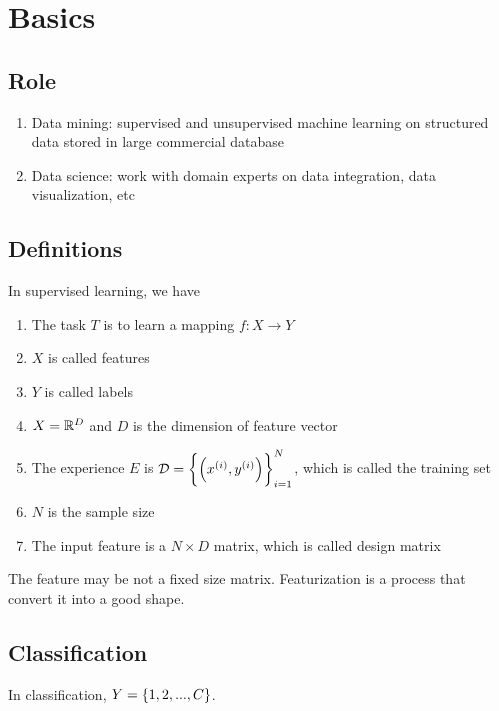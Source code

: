 \chapter{Basics}

\section{Role}

\begin{enumerate}
    \item Data mining: supervised and unsupervised machine learning on structured data stored in large commercial database
    \item Data science: work with domain experts on data integration, data visualization, etc
\end{enumerate}



\section{Definitions}

\begin{definition}
    In supervised learning, we have 
    \begin{enumerate}
        \item The task $T$ is to learn a mapping $f: X \rightarrow Y$
        \item $X$ is called features
        \item $Y$ is called labels
        \item $X = \mathbb{R}^D$ and $D$ is the dimension of feature vector
        \item The experience $E$ is $\mathcal{D} = \set{\left({x}^{(i)}, {y}^{(i)}\right)}_{i=1}^N$, which is called the training set
        \item $N$ is the sample size
        \item The input feature is a $N \times D$ matrix, which is called design matrix
    \end{enumerate}
\end{definition}



The feature may be not a fixed size matrix. Featurization is a process that convert it into a good shape.


\section{Classification}
In classification, $Y = \set{1, 2, ... , C}$.

